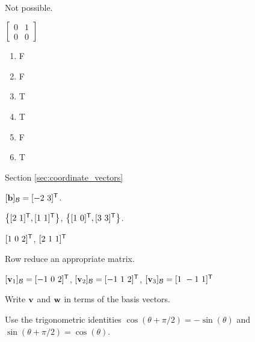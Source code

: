 \begin{multicols}{2}
\item ~
\ba
\item Not possible.

\item $\left[ \begin{array}{cc} 0&1\\0&0 \end{array} \right]$
\ea


	
\item 
\begin{enumerate}[label=(\alph*), leftmargin=1\parindent]
\item F
\item F
\item T
\item T
\item F
\item T


\end{enumerate}



\oee

\hspace{-0.25in} Section \ref{sec:coordinate_vectors}

\obe

\item $[\mathbf{b}]_{\mathcal{B}} = [-2 \ 3]^{\mathsf{T}}$. 

\item $\left\{ [2 \ 1]^{\tr}, [1 \ 1]^{\tr}\right\}$, $\left\{ [1 \ 0]^{\tr}, [3 \ 3]^{\tr}\right\}$.  

\item $[1 \ 0 \ 2]^{\mathsf{T}}$,  $[2 \ 1 \ 1]^{\mathsf{T}}$ 
 
\item 
	\ba
	\item Row reduce an appropriate matrix. 
	 
	\item $[\vv_1]_{\CB} = [ -1 \ 0 \ 2]^{\tr}$, $[\vv_2]_{\CB} = [-1 \ 1 \ 2]^{\tr}$, $ [\vv_3]_{\CB} = [1 \ -1 \ 1]^{\tr}$ 

	\ea

\item Write $\mathbf{v}$ and $\mathbf{w}$ in terms of the basis vectors. 

\item 
\ba
\item Use the trigonometric identities $\cos(\theta+ \pi/2) = -\sin(\theta)$ and $\sin(\theta+ \pi/2) = \cos(\theta)$.


\end{multicols}
